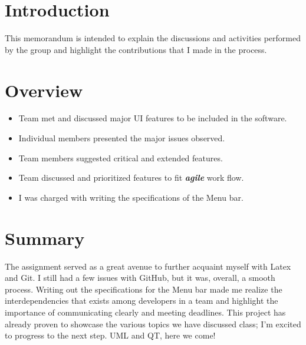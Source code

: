 \documentclass[a4paper,12pt]{texMemo}
\begin{document}
\maketitle
\section*{Introduction}
This memorandum is intended to explain the discussions and activities performed by the group and highlight the contributions that I made in the process. 

\section*{Overview}
\begin{itemize}
\item Team met and discussed major UI features to be included in the software.
\item Individual members presented the major issues observed.
\item Team members suggested critical and extended features.
\item Team discussed and prioritized features to fit \textbf{\textit{agile}} work flow. 
\item I was charged with writing the specifications of the Menu bar. 
\end{itemize}

\section*{Summary}
The assignment served as a great avenue to further acquaint myself with Latex and Git. I still had a few issues with GitHub, but it was, overall, a smooth process. Writing out the specifications for the Menu bar made me realize the interdependencies that exists among developers in a team and highlight the importance of communicating clearly and meeting deadlines. This project has already proven to showcase the various topics we have discussed class; I'm excited to progress to the next step. 
\bigskip
\newline UML and QT, here we come!
\end{document}
